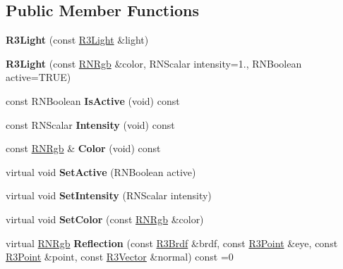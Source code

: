 \subsection*{Public Member Functions}
\begin{DoxyCompactItemize}
\item 
{\bfseries R3\+Light} (const \hyperlink{class_r3_light}{R3\+Light} \&light)\hypertarget{class_r3_light_add6fecb84c797c512ca9566f1bd38ffe}{}\label{class_r3_light_add6fecb84c797c512ca9566f1bd38ffe}

\item 
{\bfseries R3\+Light} (const \hyperlink{class_r_n_rgb}{R\+N\+Rgb} \&color, R\+N\+Scalar intensity=1., R\+N\+Boolean active=T\+R\+UE)\hypertarget{class_r3_light_aad9f988b6d6b5bc0aabf7f0e351265b7}{}\label{class_r3_light_aad9f988b6d6b5bc0aabf7f0e351265b7}

\item 
const R\+N\+Boolean {\bfseries Is\+Active} (void) const \hypertarget{class_r3_light_ae7a1dd4aec471248036f813710b0c556}{}\label{class_r3_light_ae7a1dd4aec471248036f813710b0c556}

\item 
const R\+N\+Scalar {\bfseries Intensity} (void) const \hypertarget{class_r3_light_a69f41c26e429ae91ca381b9ae94a5723}{}\label{class_r3_light_a69f41c26e429ae91ca381b9ae94a5723}

\item 
const \hyperlink{class_r_n_rgb}{R\+N\+Rgb} \& {\bfseries Color} (void) const \hypertarget{class_r3_light_a514bcc5f8b6174ea86f9e5c9d47e90b9}{}\label{class_r3_light_a514bcc5f8b6174ea86f9e5c9d47e90b9}

\item 
virtual void {\bfseries Set\+Active} (R\+N\+Boolean active)\hypertarget{class_r3_light_a3e63231405abc3733faad292319c6294}{}\label{class_r3_light_a3e63231405abc3733faad292319c6294}

\item 
virtual void {\bfseries Set\+Intensity} (R\+N\+Scalar intensity)\hypertarget{class_r3_light_afe46e426b3e9223083fdbb8f6b9b943f}{}\label{class_r3_light_afe46e426b3e9223083fdbb8f6b9b943f}

\item 
virtual void {\bfseries Set\+Color} (const \hyperlink{class_r_n_rgb}{R\+N\+Rgb} \&color)\hypertarget{class_r3_light_a66d85f36dc01ae14fd5bbcc5484fcc24}{}\label{class_r3_light_a66d85f36dc01ae14fd5bbcc5484fcc24}

\item 
virtual \hyperlink{class_r_n_rgb}{R\+N\+Rgb} {\bfseries Reflection} (const \hyperlink{class_r3_brdf}{R3\+Brdf} \&brdf, const \hyperlink{class_r3_point}{R3\+Point} \&eye, const \hyperlink{class_r3_point}{R3\+Point} \&point, const \hyperlink{class_r3_vector}{R3\+Vector} \&normal) const  =0\hypertarget{class_r3_light_a1a71a0fe232ccb31beeb50d713b875c3}{}\label{class_r3_light_a1a71a0fe232ccb31beeb50d713b875c3}


\end{DoxyCompactItemize}
